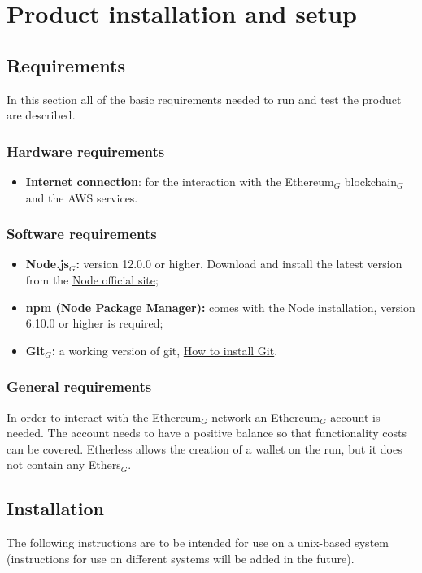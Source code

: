 \section{Product installation and setup}
  \subsection{Requirements}
    In this section all of the basic requirements needed to run and test the product are described.
    \subsubsection{Hardware requirements}
      \begin{itemize}
      	\item \textbf{Internet connection}: for the interaction with the Ethereum$_{G}$ blockchain$_{G}$ and the AWS services.
      \end{itemize}
    \subsubsection{Software requirements}
      \begin{itemize}
        \item \textbf{Node.js$_{G}$:} version 12.0.0 or higher. Download and install the latest version from the \href{https://nodejs.org/it/download/}{Node official site};
        \item \textbf{npm (Node Package Manager):} comes with the Node installation, version 6.10.0 or higher is required;
        \item \textbf{Git$_{G}$:} a working version of git, \href{https://git-scm.com/book/en/v2/Getting-Started-Installing-Git}{How to install Git}.
      \end{itemize}
    \subsubsection{General requirements}
      In order to interact with the Ethereum$_{G}$ network an Ethereum$_{G}$ account is needed. The account needs to have a positive balance so that functionality costs can be covered. Etherless allows the creation of a wallet on the run, but it does not contain any Ethers$_{G}$.
  \subsection{Installation}
    The following instructions are to be intended for use on a unix-based system (instructions for use on different systems will be added in the future).
